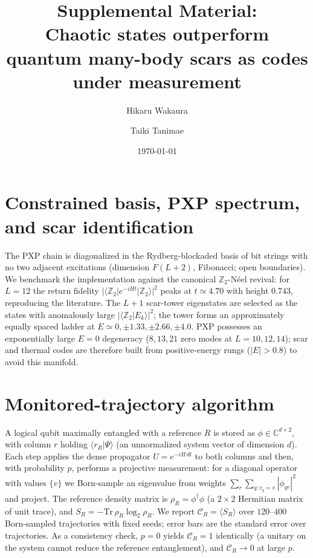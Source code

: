 \documentclass[aps,prxquantum,twocolumn,superscriptaddress,floatfix,longbibliography]{revtex4-2}
\newcommand{\CR}{\mathcal{C}_R}
\newcommand{\Ztwo}{\mathbb{Z}_2}
\begin{document}
\title{Supplemental Material:\\ Chaotic states outperform quantum many-body
scars as codes under measurement}

\author{Hikaru Wakaura}
\author{Taiki Tanimae}

\date{\today}
\maketitle

\renewcommand{\thesection}{S\arabic{section}}
\renewcommand{\theequation}{S\arabic{equation}}
\renewcommand{\thefigure}{S\arabic{figure}}
\renewcommand{\thetable}{S\arabic{table}}
\setcounter{figure}{0}\setcounter{equation}{0}\setcounter{table}{0}

\section{Constrained basis, PXP spectrum, and scar identification}

The PXP chain is diagonalized in the Rydberg-blockaded basis of bit strings with
no two adjacent excitations (dimension $F(L{+}2)$, Fibonacci; open boundaries).
We benchmark the implementation against the canonical $\Ztwo$-N\'eel revival:
for $L=12$ the return fidelity $|\langle\Ztwo|e^{-iHt}|\Ztwo\rangle|^2$ peaks at
$t\simeq4.70$ with height $0.743$, reproducing the literature. The $L{+}1$
scar-tower eigenstates are selected as the states with anomalously large
$|\langle\Ztwo|E_k\rangle|^2$; the tower forms an approximately equally spaced
ladder at $E\simeq0,\pm1.33,\pm2.66,\pm4.0$. PXP possesses an exponentially large
$E=0$ degeneracy ($8,13,21$ zero modes at $L=10,12,14$); scar and thermal codes
are therefore built from positive-energy rungs ($|E|>0.8$) to avoid this
manifold.

\section{Monitored-trajectory algorithm}

A logical qubit maximally entangled with a reference $R$ is stored as
$\phi\in\mathbb{C}^{d\times2}$, with column $r$ holding $\langle r_R|\Psi\rangle$
(an unnormalized system vector of dimension $d$). Each step applies the dense
propagator $U=e^{-iH\,dt}$ to both columns and then, with probability $p$,
performs a projective measurement: for a diagonal operator with values $\{v\}$ we
Born-sample an eigenvalue from weights $\sum_r\sum_{q:v_q=v}|\phi_{qr}|^2$ and
project. The reference density matrix is $\rho_R=\phi^\dagger\phi$ (a $2\times2$
Hermitian matrix of unit trace), and $S_R=-\mathrm{Tr}\,\rho_R\log_2\rho_R$. We
report $\CR=\langle S_R\rangle$ over $120$--$400$ Born-sampled trajectories with
fixed seeds; error bars are the standard error over trajectories. As a
consistency check, $p=0$ yields $\CR=1$ identically (a unitary on the system
cannot reduce the reference entanglement), and $\CR\to0$ at large $p$.
\end{document}
